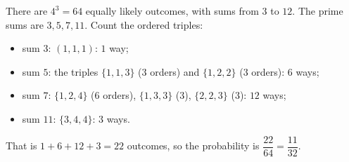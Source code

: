 There are $4^3=64$ equally likely outcomes, with sums from $3$ to $12$. The prime sums are $3,5,7,11$. Count the ordered triples:
\begin{itemize}
\item sum $3$: $(1,1,1)$: $1$ way;
\item sum $5$: the triples $\{1,1,3\}$ ($3$ orders) and $\{1,2,2\}$ ($3$ orders): $6$ ways;
\item sum $7$: $\{1,2,4\}$ ($6$ orders), $\{1,3,3\}$ ($3$), $\{2,2,3\}$ ($3$): $12$ ways;
\item sum $11$: $\{3,4,4\}$: $3$ ways.
\end{itemize}
That is $1+6+12+3=22$ outcomes, so the probability is $\dfrac{22}{64}=\boxed{\dfrac{11}{32}}$.
